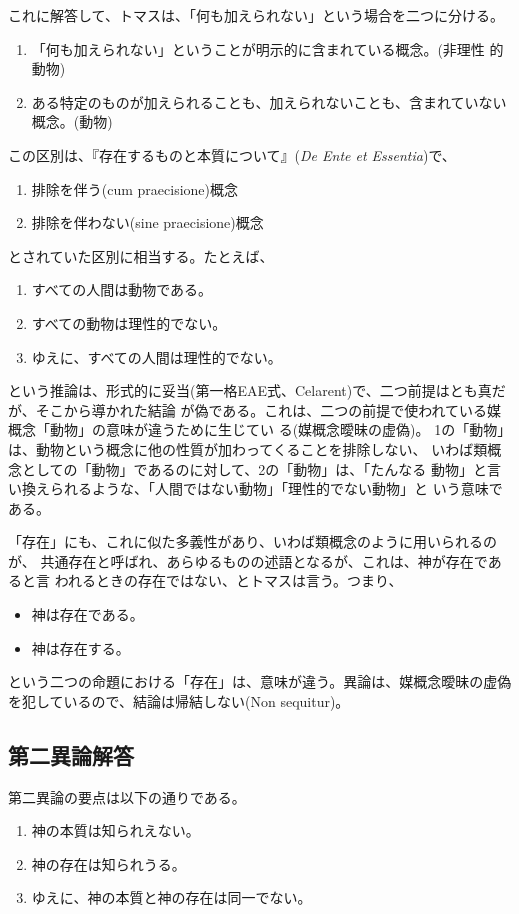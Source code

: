\documentclass[paper=a4paper,fontsize=10pt,jafontsize=9pt,titlepage]{jlreq}
\begin{document}
これに解答して、トマスは、「何も加えられない」という場合を二つに分ける。
\begin{enumerate}
 \item 「何も加えられない」ということが明示的に含まれている概念。(非理性
       的動物)
 \item ある特定のものが加えられることも、加えられないことも、含まれていない概念。(動物)
\end{enumerate}
\noindent
この区別は、『存在するものと本質について』({\itshape De Ente et Essentia})で、
\begin{enumerate}
 \item 排除を伴う(cum praecisione)概念
 \item 排除を伴わない(sine praecisione)概念
\end{enumerate}
\noindent
とされていた区別に相当する。たとえば、
\begin{enumerate}
 \item すべての人間は動物である。
 \item すべての動物は理性的でない。
 \item ゆえに、すべての人間は理性的でない。
\end{enumerate}
\noindent
という推論は、形式的に妥当(第一格EAE式、Celarent)で、二つ前提はとも真だ
が、そこから導かれた結論
が偽である。これは、二つの前提で使われている媒概念「動物」の意味が違うために生じてい
る(媒概念曖昧の虚偽)。
1の「動物」は、動物という概念に他の性質が加わってくることを排除しない、
いわば類概念としての「動物」であるのに対して、2の「動物」は、「たんなる
動物」と言い換えられるような、「人間ではない動物」「理性的でない動物」と
いう意味である。

「存在」にも、これに似た多義性があり、いわば類概念のように用いられるのが、
共通存在と呼ばれ、あらゆるものの述語となるが、これは、神が存在であると言
われるときの存在ではない、とトマスは言う。つまり、
\begin{itemize}
 \item 神は存在である。
 \item 神は存在する。
\end{itemize}
\noindent
という二つの命題における「存在」は、意味が違う。異論は、媒概念曖昧の虚偽
を犯しているので、結論は帰結しない(Non sequitur)。

\subsection{第二異論解答}
第二異論の要点は以下の通りである。
\begin{enumerate}
 \item 神の本質は知られえない。
 \item 神の存在は知られうる。
 \item ゆえに、神の本質と神の存在は同一でない。
\end{enumerate}
\end{document}
